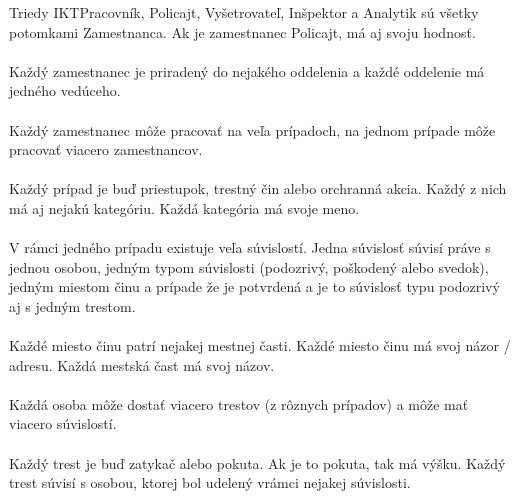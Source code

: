 \documentclass[11pt,a4paper]{article}
\begin{document}
    Triedy IKTPracovník, Policajt, Vyšetrovateľ, Inšpektor a Analytik sú všetky potomkami Zamestnanca. Ak je zamestnanec Policajt, má aj svoju hodnosť.
    \\
    \\
    Každý zamestnanec je priradený do nejakého oddelenia a každé oddelenie má jedného vedúceho.
    \\
    \\
    Každý zamestnanec môže pracovať na veľa prípadoch, na jednom prípade môže pracovať viacero zamestnancov.
    \\
    \\
    Každý prípad je buď priestupok, trestný čin alebo orchranná akcia. Každý z nich má aj nejakú kategóriu. Každá kategória má svoje meno.
    \\
    \\
    V rámci jedného prípadu existuje veľa súvislostí. Jedna súvislosť súvisí práve s jednou osobou, jedným typom súvislosti (podozrivý, poškodený alebo svedok), jedným miestom činu a prípade že je potvrdená a je to súvislosť typu podozrivý aj s jedným trestom.
    \\
    \\
    Každé miesto činu patrí nejakej mestnej časti. Každé miesto činu má svoj názor / adresu. Každá mestská čast má svoj názov.
    \\
    \\
    Každá osoba môže dostať viacero trestov (z rôznych prípadov) a môže mať viacero súvislostí.
    \\
    \\
    Každý trest je buď zatykač alebo pokuta. Ak je to pokuta, tak má výšku. Každý trest súvisí s osobou, ktorej bol udelený vrámci nejakej súvislosti.
    \\
    \\
\end{document}
